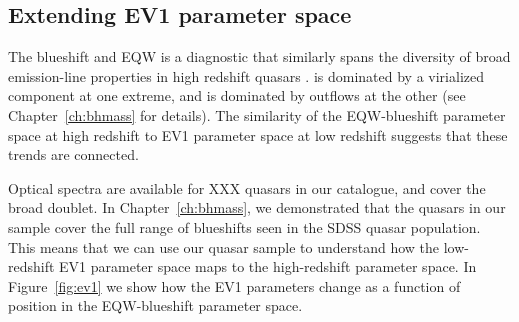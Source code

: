 \subsection{Extending EV1 parameter space}

The  blueshift and EQW is a diagnostic that similarly spans the diversity of broad emission-line properties in high redshift quasars \citep{sulentic07,richards11}. 
 is dominated by a virialized component at one extreme, and is dominated by outflows at the other (see Chapter~\ref{ch:bhmass} for details). 
The similarity of the  EQW-blueshift parameter space at high redshift to EV1 parameter space at low redshift suggests that these trends are connected. 

Optical spectra are available for XXX quasars in our catalogue, and cover the broad  doublet. 
In Chapter~\ref{ch:bhmass}, we demonstrated that the quasars in our sample cover the full range of  blueshifts seen in the SDSS quasar population. 
This means that we can use our quasar sample to understand how the low-redshift EV1 parameter space maps to the high-redshift  parameter space.  
In Figure~\ref{fig:ev1} we show how the EV1 parameters change as a function of position in the  EQW-blueshift parameter space.

